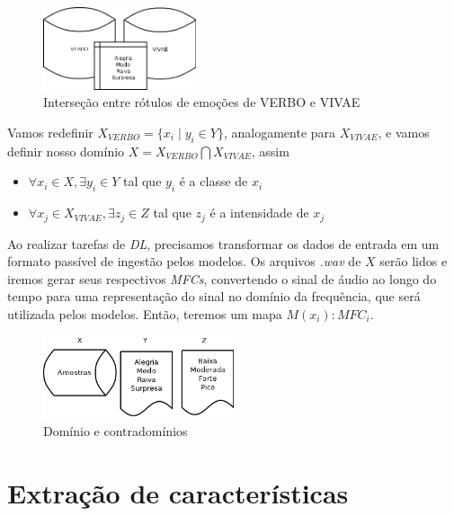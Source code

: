 \begin{figure}[!h]
    \centering
    \includegraphics[width=0.40\textwidth]{imagens/p-yverbointeryvivae.png}
    \caption{\label{fig:yverbointeryvivae}Interseção entre rótulos de emoções de VERBO e VIVAE}
\end{figure}

Vamos redefinir $X_{VERBO} = \{x_i \mid y_i \in Y\}$, analogamente para $X_{VIVAE}$, e vamos definir nosso domínio $X = X_{VERBO} \bigcap X_{VIVAE}$, assim

\begin{itemize}
    \item $\forall x_i \in X, \exists y_i \in Y$ tal que  $y_i$ é a classe de $x_i$
    \item $\forall x_j \in X_{VIVAE}, \exists z_j \in Z$ tal que  $z_j$ é a intensidade de $x_j$
\end{itemize}

Ao realizar tarefas de \textit{DL}, precisamos transformar os dados de entrada em um formato passível de ingestão pelos modelos. Os arquivos \textit{.wav} de $X$ serão lidos e iremos gerar seus respectivos \textit{MFCs}, convertendo o sinal de áudio ao longo do tempo para uma representação do sinal no domínio da frequência, que será utilizada pelos modelos. Então, teremos um mapa $M(x_i): MFC_i$.

\begin{figure}[!h]
    \centering
    \includegraphics[width=0.5\textwidth]{imagens/p-dominios-contradominos.png}
    \caption{\label{fig:dominioscontradominios}Domínio e contradomínios}
\end{figure}

\section{Extração de características}\label{sec:bravo_ae}

